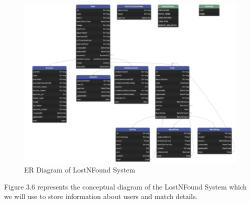 \newpage
\begin{figure}
    \centering
    \includegraphics[width=1\linewidth]{chapter3/er-diagram.png}
    \caption{ER Diagram of LostNFound System}
    \label{fig:ER Diagram of LostNFound System}
\end{figure}
\par
Figure 3.6 represents the conceptual diagram of the LostNFound System which we will use to store information about users and match details.